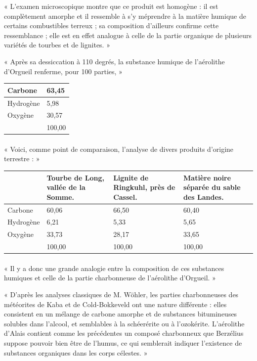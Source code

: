 \documentclass[a4paper, 11pt, oneside, polutonikogreek, french]{article}
\begin{document}
« L'examen microscopique montre que ce produit est homogène : il est complètement amorphe et il ressemble à s'y méprendre à la matière humique de certains combustibles terreux ; sa composition d'ailleurs confirme cette ressemblance ; elle est en effet analogue à celle de la partie organique de plusieurs variétés de tourbes et de lignites. »

« Après sa dessiccation à 110 degrés, la substance humique de l'aérolithe d'Orgueil renferme, pour 100 parties, »
\begin{table}[H]
    \centering
    \begin{tabular}{|l|l|}
    \hline
        Carbone & 63,45 \\ \hline
        Hydrogène & 5,98 \\ \hline
        Oxygène & 30,57 \\ \hline
        ~ & 100,00 \\ \hline
    \end{tabular}
\end{table}
\paragraph{}
« Voici, comme point de comparaison, l'analyse de divers produits d'origine terrestre : »
\begin{table}[H]
    \centering
    \begin{tabular}{|l|p{18mm}|p{18mm}|p{18mm}|}
    \hline
        ~ & Tourbe de Long, vallée de la Somme. & Lignite de Ringkuhl, près de Cassel. & Matière noire séparée du sable des Landes.   \\ \hline
        Carbone & 60,06 & 66,50 & 60,40   \\ \hline
        Hydrogène & 6,21 & 5,33 & 5,65   \\ \hline
        Oxygène & 33,73 & 28,17 & 33,65   \\ \hline
        ~ & 100,00 & 100,00 & 100,00 \\ \hline
    \end{tabular}
\end{table}
\paragraph{}
« Il y a donc une grande analogie entre la composition de ces substances humiques et celle de la partie charbonneuse de l'aérolithe d'Orgueil. »

« D'après les analyses classiques de M. Wöhler, les parties charbonneuses des météorites de Kaba et de Cold-Bokkeveld ont une nature différente : elles consistent en un mélange de carbone amorphe et de substances bitumineuses solubles dans l'alcool, et semblables à la schéerérite ou à l'ozokérite. L'aérolithe d'Alais contient comme les précédentes un composé charbonneux que Berzélius suppose pouvoir bien être de l'humus, ce qui semblerait indiquer l'existence de substances organiques dans les corps célestes. »
\end{document}
